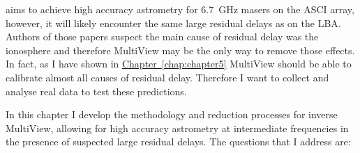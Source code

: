 	\spirals\space aims to achieve high accuracy astrometry for 6.7~GHz masers on the ASCI array, however, it will likely encounter the same large residual delays as \citet{Krishnan2015,Krishnan2017} on the LBA. Authors of those papers suspect the main cause of residual delay was the ionosphere and therefore MultiView may be the only way to remove those effects. In fact, as I have shown in \hyperref[chap:chapter5]{Chapter~\ref*{chap:chapter5}} MultiView should be able to calibrate almost all causes of residual delay. Therefore I want to collect and analyse real data to test these predictions.

	In this chapter I develop the methodology and reduction processes for inverse MultiView, allowing for high accuracy astrometry at intermediate frequencies in the presence of suspected large residual delays. The questions that I address are:

